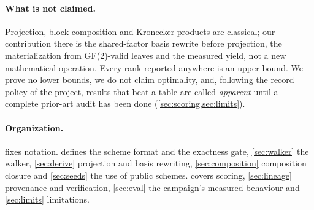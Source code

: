 

\paragraph{What is not claimed.}
Projection, block composition and Kronecker products are classical; our contribution there is the
shared-factor basis rewrite before projection, the materialization from GF(2)-valid leaves and the measured yield, not a new mathematical operation.
Every rank reported anywhere is an upper bound. We prove no lower bounds, we do not claim optimality, and, following
the record policy of the project, results that beat a table are called \emph{apparent} until a complete prior-art
audit has been done (\cref{sec:scoring,sec:limits}).

\paragraph{Organization.}
 fixes notation.  defines the scheme format and the exactness gate,
\cref{sec:walker} the walker, \cref{sec:derive} projection and basis rewriting, \cref{sec:composition} composition closure and
\cref{sec:seeds} the use of public schemes.  covers scoring, \cref{sec:lineage} provenance and verification,
\cref{sec:eval} the campaign's measured behaviour and \cref{sec:limits} limitations.
